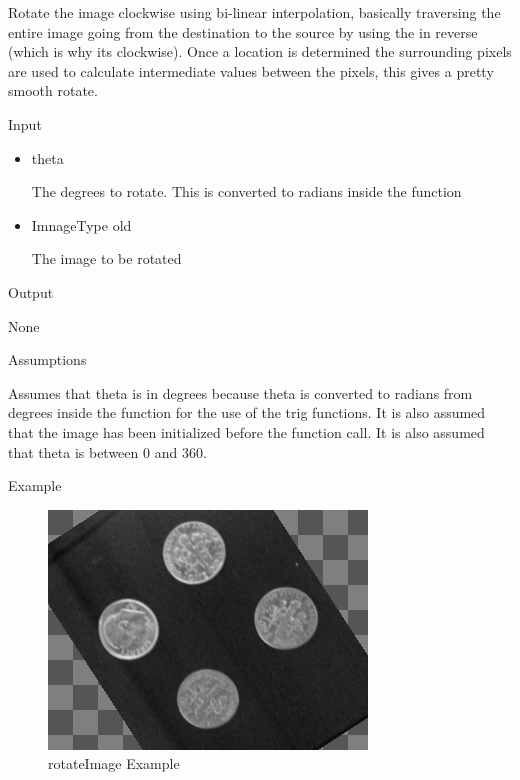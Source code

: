 \documentclass[pdftex, 11pt]{article}
\begin{document}
\begin{description}
\begin{description}
				Rotate the image clockwise using bi-linear
				interpolation, basically traversing
				the entire image going from the destination 
				to the source by using the
				in reverse (which is why its clockwise). 
				Once a location is determined the
				surrounding pixels are used to calculate 
				intermediate values between the
				pixels, this gives a pretty smooth rotate.

			\item{Input}

				\begin{itemize}

					\item{theta}

						The degrees to rotate. This is converted
						to radians inside the function

					\item{ImnageType old}

						The image to be rotated

				\end{itemize}

			\item{Output}

				None

			\item{Assumptions}

				Assumes that theta is in degrees because theta is
				converted to radians from degrees inside the function
				for the use of the trig functions.
				It is also assumed that the image has been initialized
				before the function call. It is also assumed that theta
				is between 0 and 360.

			\item{Example}

				\begin{figure}[ht!]
					\centering
					\caption{rotateImage Example}
				\includegraphics{images/outrotate.png}
			\end{figure}


\end{description}
\end{description}
\end{document}
